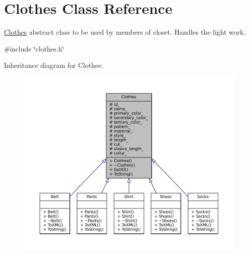 \hypertarget{classClothes}{}\section{Clothes Class Reference}
\label{classClothes}


\mbox{\hyperlink{classClothes}{Clothes}} abstract class to be used by members of closet. Handles the light work.  




{\ttfamily \#include \char`\"{}clothes.\+h\char`\"{}}



Inheritance diagram for Clothes\+:\nopagebreak
\begin{figure}[H]
\begin{center}
\leavevmode
\includegraphics[width=350pt]{classClothes__inherit__graph}
\end{center}
\end{figure}



